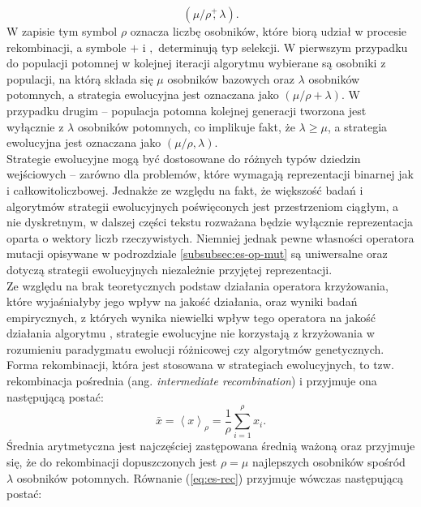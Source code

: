     \begin{equation}
     (\mu/\rho  \overset{+}{,} \lambda).
    \end{equation}
    W zapisie tym symbol $\rho$ oznacza liczbę osobników, które biorą udział w procesie rekombinacji, a symbole $+$ i $,$ determinują typ selekcji. W pierwszym przypadku do populacji potomnej w kolejnej iteracji algorytmu wybierane są osobniki z populacji, na którą składa się $\mu$ osobników bazowych oraz $\lambda$ osobników potomnych, a strategia ewolucyjna jest oznaczana jako $(\mu/\rho + \lambda)$. W przypadku drugim -- populacja potomna kolejnej generacji tworzona jest wyłącznie z $\lambda$ osobników potomnych, co implikuje fakt, że $\lambda \geq \mu$, a strategia ewolucyjna jest oznaczana jako  $(\mu/\rho, \lambda)$. \\
    Strategie ewolucyjne mogą być dostosowane do różnych typów dziedzin wejściowych -- zarówno dla problemów, które wymagają reprezentacji binarnej jak i całkowitoliczbowej. Jednakże ze względu na fakt, że większość badań i algorytmów strategii ewolucyjnych poświęconych jest przestrzeniom ciągłym, a nie dyskretnym, w dalszej części tekstu rozważana będzie wyłącznie reprezentacja oparta o wektory liczb rzeczywistych. Niemniej jednak pewne własności operatora mutacji opisywane w podrozdziale \ref{subsubsec:es-op-mut} są uniwersalne oraz dotyczą strategii ewolucyjnych niezależnie przyjętej reprezentacji. \\
    Ze względu na brak teoretycznych podstaw działania operatora krzyżowania, które wyjaśniałyby jego wpływ na jakość działania, oraz wyniki badań empirycznych, z których wynika niewielki wpływ tego operatora na jakość działania algorytmu \cite{Fogel:1994}, strategie ewolucyjne nie korzystają z krzyżowania w rozumieniu paradygmatu ewolucji różnicowej czy algorytmów genetycznych. Forma rekombinacji, która jest stosowana w strategiach ewolucyjnych, to tzw. rekombinacja pośrednia (ang. \textit{intermediate recombination}) i przyjmuje ona następującą postać:
    \begin{equation}
        \label{eq:es-rec}
        \bar{x} = \left<x\right>_{\rho} = \frac{1}{\rho}\sum^{\rho}_{i = 1} x_{i}.
    \end{equation}
    Średnia arytmetyczna jest najczęściej zastępowana średnią ważoną oraz przyjmuje się, że do rekombinacji dopuszczonych jest $\rho = \mu$ najlepszych osobników spośród $\lambda$ osobników potomnych. Równanie (\ref{eq:es-rec}) przyjmuje wówczas następującą postać:
    
